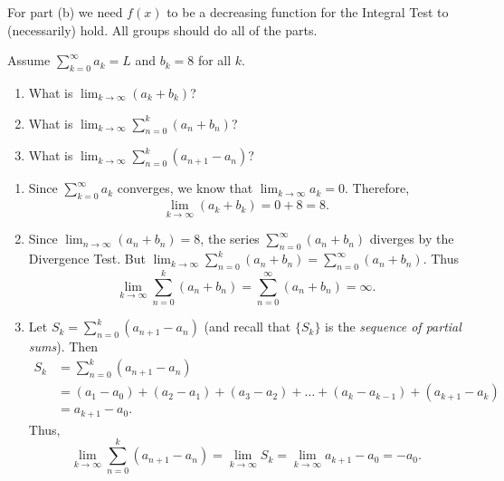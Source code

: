 \documentclass[noinstructornotes]{ximera}
\begin{document}
\begin{instructorNotes}
For part (b) we need $f(x)$ to be a decreasing function for the Integral Test to (necessarily) hold.
All groups should do all of the parts.
\end{instructorNotes}







\begin{problem}
Assume $\sum_{k=0}^\infty a_k =L$ and $b_k = 8$ for all $k$. 
	\begin{enumerate}
	
	\item  What is $\lim_{k \to \infty} (a_k + b_k)$?
	
	\item  What is $\lim_{k \to \infty} \sum_{n=0}^k (a_n + b_n)$?
	
	\item  What is $\lim_{k \to \infty} \sum_{n=0}^k (a_{n+1} - a_n)$?
	
	\end{enumerate}
	
	\begin{freeResponse}
		\begin{enumerate}
	
		\item  Since $\sum_{k=0}^\infty a_k$ converges, we know that $\lim_{k \to \infty} a_k = 0$.  
		Therefore,
			\[
			\lim_{k \to \infty} (a_k + b_k) = 0 + 8 = \boxed{8}.
			\]
	
		\item  Since $\lim_{n \to \infty} (a_n + b_n) = 8$, the series $\sum_{n=0}^\infty (a_n + b_n)$ diverges by the Divergence Test.  
		But $\lim_{k \to \infty}  \sum_{n=0}^k (a_n + b_n) = \sum_{n=0}^\infty (a_n + b_n)$.  
		Thus
			\[
			\lim_{k \to \infty}  \sum_{n=0}^k (a_n + b_n) = \sum_{n=0}^\infty (a_n + b_n) = \boxed{\infty}.
			\]
	
		\item  Let $S_k = \sum_{n=0}^k (a_{n+1} - a_n)$ (and recall that $\{ S_k \}$ is the {\it sequence of partial sums}).
		Then
			\begin{align*}
			S_k &= \sum_{n=0}^k (a_{n+1} - a_n)  \\
			&= (a_1 - a_0) + (a_2 - a_1) + (a_3 - a_2) + \hdots + (a_k - a_{k-1}) + (a_{k+1} - a_k)  \\
			&= a_{k+1} - a_0.
			\end{align*}
		Thus,
			\[
			\lim_{k \to \infty} \sum_{n=0}^k (a_{n+1} - a_n) = \lim_{k \to \infty} S_k = \lim_{k \to \infty} a_{k+1} - a_0 = \boxed{-a_0}.
			\]
	
		\end{enumerate}
	\end{freeResponse}
		
\end{problem}
\end{document}
